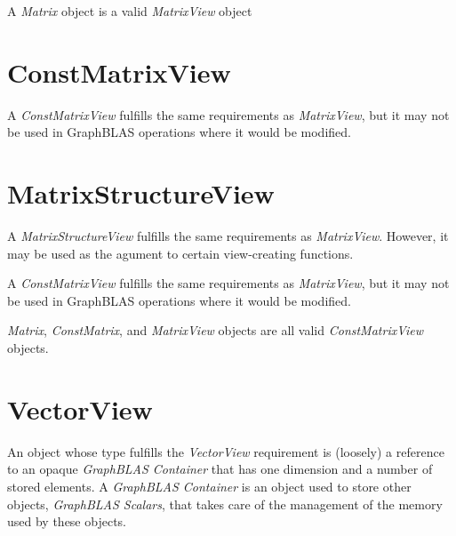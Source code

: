 
A \emph{Matrix} object is a valid \emph{MatrixView} object

\section{ConstMatrixView}

A \textit{ConstMatrixView} fulfills the same requirements as \textit{MatrixView}, but it may not be used in GraphBLAS operations where it would be modified.


\section{MatrixStructureView}
A \textit{MatrixStructureView} fulfills the same requirements as \textit{MatrixView}.  However, it may be used as the agument to certain view-creating functions.


A \textit{ConstMatrixView} fulfills the same requirements as \textit{MatrixView}, but it may not be used in GraphBLAS operations where it would be modified.


\emph{Matrix}, \emph{ConstMatrix}, and \emph{MatrixView} objects are all valid \emph{ConstMatrixView} objects.

\section{VectorView}

An object whose type fulfills the \textit{VectorView} requirement is (loosely) a 
reference to an opaque \textit{GraphBLAS Container} that has one dimension and a 
number of stored elements.  A \textit{GraphBLAS Container} is an object used to store
other objects, \textit{GraphBLAS Scalars}, that takes care of the management of the
memory used by these objects. 


